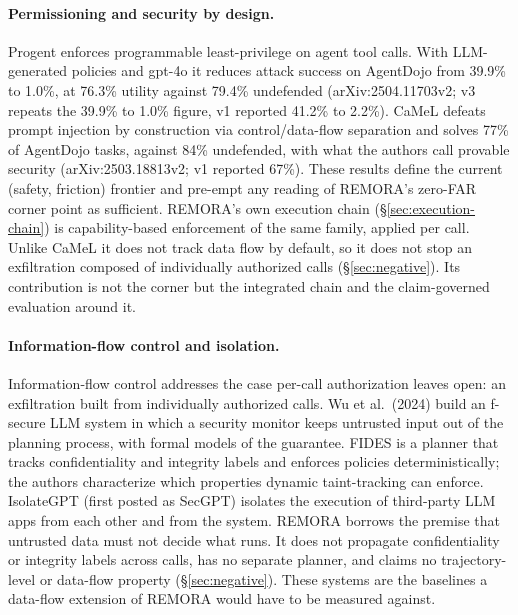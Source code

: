 \documentclass[10pt,twocolumn]{article}
\begin{document}
\paragraph{Permissioning and security by design.}
Progent \cite{shi2025progent} enforces programmable least-privilege on
agent tool calls. With LLM-generated policies and gpt-4o it reduces
attack success on AgentDojo from 39.9\% to 1.0\%, at 76.3\% utility
against 79.4\% undefended (arXiv:2504.11703v2; v3 repeats the 39.9\% to
1.0\% figure, v1 reported 41.2\% to 2.2\%). CaMeL
\cite{debenedetti2025camel} defeats prompt injection by construction via
control/data-flow separation and solves 77\% of AgentDojo tasks, against
84\% undefended, with what the authors call provable security
(arXiv:2503.18813v2; v1 reported 67\%). These results define the current (safety, friction)
frontier and pre-empt any reading of REMORA's zero-FAR corner point as
sufficient. REMORA's own execution chain
(\S\ref{sec:execution-chain}) is capability-based enforcement of the same
family, applied per call. Unlike CaMeL it does not track data flow by
default, so it does not stop an exfiltration composed of individually authorized calls
(\S\ref{sec:negative}). Its contribution is not the corner but the
integrated chain and the claim-governed evaluation around it.

\paragraph{Information-flow control and isolation.}
Information-flow control addresses the case per-call authorization
leaves open: an exfiltration built from individually authorized calls.
Wu et al.\ (2024) \cite{wu2024fsecure} build an f-secure LLM system in
which a security monitor keeps untrusted input out of the planning
process, with formal models of the guarantee. FIDES
\cite{costa2025fides} is a planner that tracks confidentiality and
integrity labels and enforces policies deterministically; the authors
characterize which properties dynamic taint-tracking can enforce.
IsolateGPT \cite{wu2025isolategpt} (first posted as SecGPT) isolates the
execution of third-party LLM apps from each other and from the system.
REMORA borrows the premise that untrusted data must not decide what runs.
It does not propagate confidentiality or integrity labels across calls,
has no separate planner, and claims no trajectory-level or data-flow
property (\S\ref{sec:negative}). These systems are the baselines a
data-flow extension of REMORA would have to be measured against.
\end{document}

